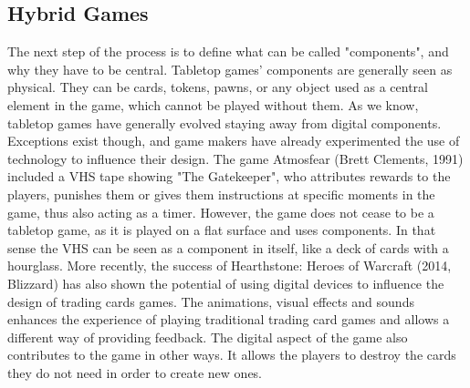 \subsection{Hybrid Games}

The next step of the process is to define what can be called "components", and why they have to be central. Tabletop games' components are generally seen as physical. They can be cards, tokens, pawns, or any object used as a central element in the game, which cannot be played without them.  As we know, tabletop games have generally evolved staying away from digital components. Exceptions exist though, and game makers have already experimented the use of technology to influence their design. The game Atmosfear (Brett Clements, 1991) included a VHS tape showing "The Gatekeeper", who attributes rewards to the players, punishes them or gives them instructions at specific moments in the game, thus also acting as a timer. However, the game does not cease to be a tabletop game, as it is played on a flat surface and uses components. In that sense the VHS can be seen as a component in itself, like a deck of cards with a hourglass. 
More recently, the success of Hearthstone: Heroes of Warcraft (2014, Blizzard) has also shown the potential of using digital devices to influence the design of trading cards games. The animations, visual effects and sounds enhances the experience of playing traditional trading card games and allows a different way of providing feedback. The digital aspect of the game also contributes to the game in other ways. It allows the players to destroy the cards they do not need in order to create new ones.
